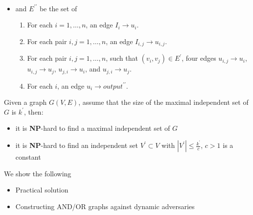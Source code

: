 \documentclass[portrait]{seminar}
\begin{document}
\newpage




\vskip -30pt\ 
\begin{itemize}
\item  and $E^{\prime\prime}$ be the set of 
\begin{enumerate}
\item For each $i=1,\ldots, n$, an edge
$I_i\!\rightarrow\! u_i$.
\item For each  pair $i,j=1,\ldots, n$, 
an edge $I_{i,j}\!\rightarrow\! u_{i,j}$.
\item For each pair $i,j=1,\ldots, n$, 
such that $(v_i,v_j)\in E^\prime$,
four edges $u_{i,j}\!\rightarrow\! u_i$,
$u_{i,j}\!\rightarrow\! u_j$,  $u_{j,i}\!\rightarrow\! u_i$,
and $u_{j,i}\!\rightarrow\! u_j$.
\item For each $i$, an edge 
$u_i\!\rightarrow\! output^{\prime\prime}$.
\end{enumerate}
\end{itemize}


\newpage


Given a graph $G(V,E)$, assume that the size of the maximal
independent set of $G$ is $k^\prime$, then:
\begin{itemize}
\item it is {\bf NP}-hard to find a maximal independent 
set of $G$
\item it is {\bf NP}-hard to find an independent set $V^\prime\subset V$
with $|V^\prime|\le \frac{k^\prime}{c}$, $c>1$ is a constant 
\end{itemize}

We show the following


\makebox[5mm]{}

\newpage
{}

\begin{itemize}
\item Practical solution
\item Constructing AND/OR graphs against dynamic adversaries
\end{itemize}

\end{document}
